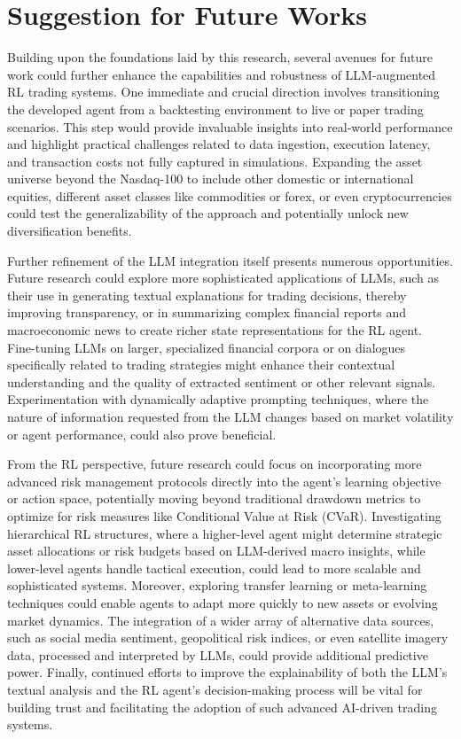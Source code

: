 \section{Suggestion for Future Works}
Building upon the foundations laid by this research, several avenues for future work could further enhance the capabilities and robustness of \gls{LLM}-augmented \gls{RL} trading systems. One immediate and crucial direction involves transitioning the developed agent from a backtesting environment to live or paper trading scenarios. This step would provide invaluable insights into real-world performance and highlight practical challenges related to data ingestion, execution latency, and transaction costs not fully captured in simulations. Expanding the asset universe beyond the Nasdaq-100 to include other domestic or international equities, different asset classes like commodities or forex, or even cryptocurrencies could test the generalizability of the approach and potentially unlock new diversification benefits.

Further refinement of the \gls{LLM} integration itself presents numerous opportunities. Future research could explore more sophisticated applications of \gls{LLM}s, such as their use in generating textual explanations for trading decisions, thereby improving transparency, or in summarizing complex financial reports and macroeconomic news to create richer state representations for the \gls{RL} agent. Fine-tuning \gls{LLM}s on larger, specialized financial corpora or on dialogues specifically related to trading strategies might enhance their contextual understanding and the quality of extracted sentiment or other relevant signals. Experimentation with dynamically adaptive prompting techniques, where the nature of information requested from the \gls{LLM} changes based on market volatility or agent performance, could also prove beneficial.

From the \gls{RL} perspective, future research could focus on incorporating more advanced risk management protocols directly into the agent's learning objective or action space, potentially moving beyond traditional drawdown metrics to optimize for risk measures like Conditional Value at Risk (CVaR). Investigating hierarchical \gls{RL} structures, where a higher-level agent might determine strategic asset allocations or risk budgets based on \gls{LLM}-derived macro insights, while lower-level agents handle tactical execution, could lead to more scalable and sophisticated systems. Moreover, exploring transfer learning or meta-learning techniques could enable agents to adapt more quickly to new assets or evolving market dynamics. The integration of a wider array of alternative data sources, such as social media sentiment, geopolitical risk indices, or even satellite imagery data, processed and interpreted by \gls{LLM}s, could provide additional predictive power. Finally, continued efforts to improve the explainability of both the \gls{LLM}'s textual analysis and the \gls{RL} agent's decision-making process will be vital for building trust and facilitating the adoption of such advanced AI-driven trading systems.
